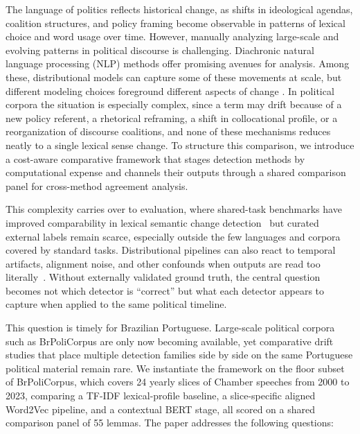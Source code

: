 \documentclass[12pt]{article}
\begin{document}
The language of politics reflects historical change, as shifts in ideological agendas, coalition structures, and policy framing become observable in patterns of lexical choice and word usage over time. However, manually analyzing large-scale and evolving patterns in political discourse is challenging. Diachronic natural language processing (NLP) methods offer promising avenues for analysis. Among these, distributional models can capture some of these movements at scale, but different modeling choices foreground different aspects
of change
\cite{hamilton-etal-2016-diachronic,kutuzov-etal-2018-diachronic,tahmasebi-etal-2021-computational}.
In political corpora the situation is especially complex, since a term may drift
because of a new policy referent, a rhetorical reframing, a shift in
collocational profile, or a reorganization of discourse coalitions, and none of
these mechanisms reduces neatly to a single lexical sense change. To structure
this comparison, we introduce a cost-aware comparative framework that stages
detection methods by computational expense and channels their outputs through a
shared comparison panel for cross-method agreement analysis.

This complexity carries over to evaluation, where shared-task benchmarks have
improved comparability in lexical semantic change
detection~\cite{schlechtweg-etal-2020-semeval} but curated external labels
remain scarce, especially outside the few languages and corpora covered by
standard tasks. Distributional pipelines can also react to temporal artifacts,
alignment noise, and other confounds when outputs are read too
literally~\cite{dubossarsky-etal-2019-timeout}. Without externally validated
ground truth, the central question becomes not which detector is ``correct''
but what each detector appears to capture when applied to the same political
timeline.

This question is timely for Brazilian Portuguese. Large-scale political corpora
such as BrPoliCorpus \cite{lima-lopes-2025-brpolicorpus} are only now becoming
available, yet comparative drift studies that place multiple detection families
side by side on the same Portuguese political material remain rare. We
instantiate the framework on the floor subset of BrPoliCorpus, which covers 24
yearly slices of Chamber speeches from 2000 to 2023, comparing a TF-IDF
lexical-profile baseline, a slice-specific aligned Word2Vec pipeline, and a
contextual BERT stage, all scored on a shared comparison panel of 55 lemmas.
The paper addresses the following questions: 
\end{document}
